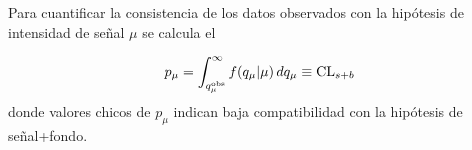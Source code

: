 





Para cuantificar la consistencia de los datos observados con la hipótesis de
intensidad de se\~nal $\mu$ se calcula el {\pvalue}

\begin{equation}
  p_\mu = \int_{q_{\mu}^{\text{obs}}}^{\infty} f(q_\mu|\mu) \, dq_\mu \equiv \mathrm{CL}_{s+b}
  \label{eq:pmu}
\end{equation}
%
donde valores chicos de $p_\mu$ indican baja compatibilidad con la hipótesis
de señal+fondo.

